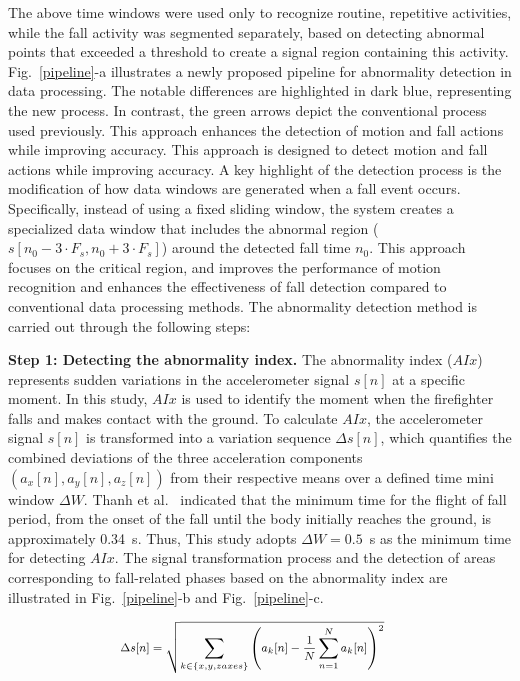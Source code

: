 \documentclass[journal,twoside,web]{ieeecolor}
\begin{document}
The above time windows were used only to recognize routine, repetitive activities, while the fall activity was segmented separately, based on detecting abnormal points that exceeded a threshold to create a signal region containing this activity. Fig.~\ref{pipeline}-a illustrates a newly proposed pipeline for abnormality detection in data processing. The notable differences are highlighted in dark blue, representing the new process. In contrast, the green arrows depict the conventional process used previously. This approach enhances the detection of motion and fall actions while improving accuracy. This approach is designed to detect motion and fall actions while improving accuracy. A key highlight of the detection process is the modification of how data windows are generated when a fall event occurs. Specifically, instead of using a fixed sliding window, the system creates a specialized data window that includes the abnormal region (\(s[n_0 - 3 \cdot F_s, n_0 + 3 \cdot F_s]\)) around the detected fall time \(n_0\). This approach focuses on the critical region, and improves the performance of motion recognition and enhances the effectiveness of fall detection compared to conventional data processing methods. The abnormality detection method is carried out through the following steps:

\textbf{Step 1: Detecting the abnormality index.} The abnormality index ($AIx$) represents sudden variations in the accelerometer signal $s[n]$ at a specific moment. In this study, $AIx$ is used to identify the moment when the firefighter falls and makes contact with the ground. To calculate $AIx$, the accelerometer signal $s[n]$ is transformed into a variation sequence $\Delta s[n]$, which quantifies the combined deviations of the three acceleration components $(a_x[n], a_y[n], a_z[n])$ from their respective means over a defined time mini window $\Delta W$. Thanh et al.~\cite{Elder_Falling_2019} indicated that the minimum time for the flight of fall period, from the onset of the fall until the body initially reaches the ground, is approximately 0.34~s. Thus, This study adopts $\Delta W=0.5$~s as the minimum time for detecting $AIx$. The signal transformation process and the detection of areas corresponding to fall-related phases based on the abnormality index are illustrated in Fig.~\ref{pipeline}-b and Fig.~\ref{pipeline}-c.

\begin{equation}\footnotesize
\centering
\begin{aligned}
\Delta s[n] &= \sqrt{\sum_{k \in \{x, y, z axes\}} \left( a_k[n] - \frac{1}{N} \sum_{n=1}^{N} a_k[n] \right)^2}
\end{aligned}
\end{equation}
\end{document}
